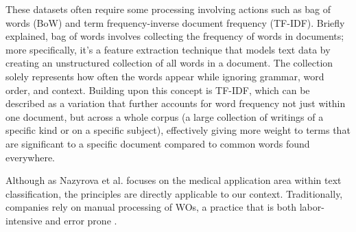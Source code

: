 These datasets often require some processing involving actions such as bag of words (BoW) and term frequency-inverse document frequency (TF-IDF). Briefly explained, \cite{murel2024bagofwords} bag of words involves collecting the frequency of words in documents; more specifically, it's a feature extraction technique that models text data by creating an unstructured collection of all words in a document. The collection solely represents how often the words appear while ignoring grammar, word order, and context. Building upon this concept is TF-IDF, which can be described as a variation that further accounts for word frequency not just within one document, but across a whole corpus (a large collection of writings of a specific kind or on a specific subject), effectively giving more weight to terms that are significant to a specific document compared to common words found everywhere.

Although as Nazyrova et al. \cite{nazyrova2024medical} focuses on the medical application area within text classification, the principles are directly applicable to our context. Traditionally, companies rely on manual processing of WOs, a practice that is both labor-intensive and error prone \cite{li2024work}.


